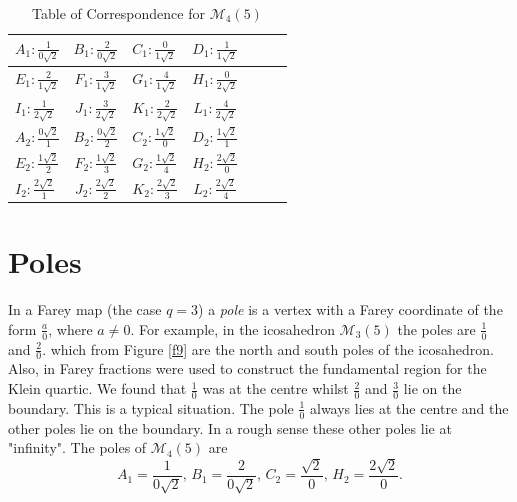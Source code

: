 \documentclass{amsproc}
\numberwithin{equation}{section}
\numberwithin{equation}{section}
\theoremstyle{definition}
\theoremstyle{remark}
\numberwithin{equation}{section}
\begin{document}
\begin{table}[H]
\caption {Table of Correspondence for $\mathscr{M}_{4}(5)$ } \label{tab:tab6} 

\centering
 \begin{tabular}{lc lc lc l} 
 \midrule 

$ A_1:\frac{1}{0\sqrt{2}}$ & $ B_1:\frac{2}{0\sqrt{2}}$ & $ C_1:\frac{0}{1\sqrt{2}}$ & $ D_1:\frac{1}{1\sqrt{2}}$ \\  
 \midrule 

 $ E_1:\frac{2}{1\sqrt{2}}$ & $ F_1:\frac{3}{1\sqrt{2}}$ & $ G_1:\frac{4}{1\sqrt{2}}$ & $ H_1:\frac{0}{2\sqrt{2}}$ \\ 
 \midrule 

$ I_1:\frac{1}{2\sqrt{2}}$ & $ J_1:\frac{3}{2\sqrt{2}}$ & $ K_1:\frac{2}{2\sqrt{2}}$ & $ L_1:\frac{4}{2\sqrt{2}}$  \\
 \midrule 

 $ A_2:\frac{0\sqrt{2}}{1}$ & $ B_2:\frac{0\sqrt{2}}{2}$ & $ C_2:\frac{1\sqrt{2}}{0}$ & $ D_2:\frac{1\sqrt{2}}{1}$ \\
 \midrule 

  $ E_2:\frac{1\sqrt{2}}{2}$ & $F_2:\frac{1\sqrt{2}}{3}$ & $ G_2:\frac{1\sqrt{2}}{4}$ & $ H_2:\frac{2\sqrt{2}}{0}$ \\
 \midrule 
 $ I_2:\frac{2\sqrt{2}}{1}$&$ J_2:\frac{2\sqrt{2}}{2}$&$ K_2:\frac{2\sqrt{2}}{3}$&$ L_2:\frac{2\sqrt{2}}{4}$ \\

 \hline
 \end{tabular}
\end{table}



\section{Poles} In a Farey map (the case $q=3$) a {\it pole} is a vertex with a Farey coordinate of the form $\frac{a}{0}$, where $a\not =0.$ For example, in the icosahedron $\mathscr{M}_{3}(5)$ the poles are $\frac{1}{0}$ and $\frac{2}{0}.$ which from Figure \ref{f9} are the north and south poles of the icosahedron.  Also, in \cite{ISS} Farey fractions were used to construct the fundamental region for the Klein quartic.  We found that $\frac{1}{0}$ was at the centre whilst $\frac{2}{0}$ and $\frac{3}{0}$ lie on the boundary. This is a typical situation. The pole $\frac{1}{0}$ always lies at the centre and the other poles lie on the boundary. In a rough sense these other poles lie at "infinity". The poles of $\mathscr{M}_{4}(5)$ are
$$A_1= \frac{1}{0\sqrt 2},  \, B_1=\frac{2}{0\sqrt 2},  \,  C_2=\frac{\sqrt 2}{0}, \, H_2=\frac{2\sqrt 2}{0}.$$
   
\end{document}
